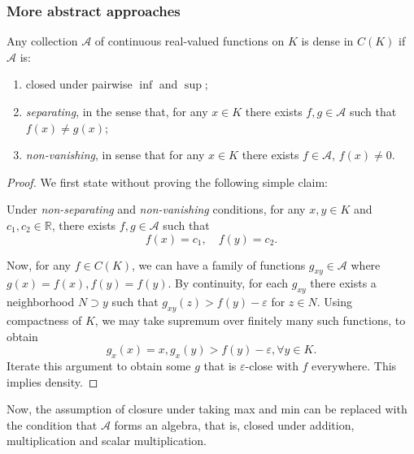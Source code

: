 \subsubsection{More abstract approaches}

\begin{theorem}
	Any collection $\mathcal{A}$ of continuous real-valued functions on $K$ is dense in $C(K)$ if $\mathcal{A}$ is:
	\begin{enumerate}
		\item closed under pairwise $\inf $ and $\sup $;
		\item \textit{separating}, in the sense that, for any $x\in K$ there exists $f, g \in \mathcal{A}$ such that $f(x) \neq g(x)$;
		\item \textit{non-vanishing}, in sense that for any $x \in K$ there exists $f \in \mathcal{A}$, $f(x) \neq 0$.
	\end{enumerate}
\end{theorem}
\begin{proof}
	We first state without proving the following simple claim:
	\begin{claim}
		Under \textit{non-separating} and \textit{non-vanishing} conditions, for any $x, y \in K$ and $c_1, c_2 \in \mathbb{R}$, there exists $f, g \in \mathcal{A}$ such that 
		\[
			f(x) = c_1, \quad f(y) = c_2
		.\] 
	\end{claim}
	Now, for any $f \in C(K)$, we can have a family of functions $g_{xy} \in \mathcal{A}$ where $g(x) = f(x), f(y) = f(y)$. By continuity, for each $g_{xy}$ there exists a neighborhood $N \supset y$ such that $g_{xy}(z) > f(y) - \varepsilon$ for $z \in N$. Using compactness of $K$, we may take supremum over finitely many such functions, to obtain
	\[
		g_x(x) = x, g_x(y) > f(y) - \varepsilon, \forall y \in K
	.\] 
	Iterate this argument to obtain some $g$ that is $\varepsilon$-close with $f$ everywhere. This implies density.
\end{proof}

Now, the assumption of closure under taking max and min can be replaced with the condition that $\mathcal{A}$ forms an algebra, that is, closed under addition, multiplication and scalar multiplication.


